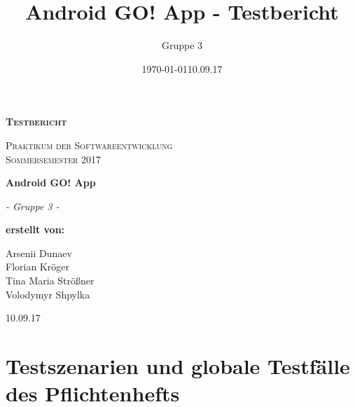 \documentclass[11pt,a4paper]{scrartcl}
\date{\today}
\title{Android GO! App - Testbericht}
\author{Gruppe 3}
\date{10.09.17}
\begin{document}
\begin{titlepage}
	\begin{center}
	{\scshape\LARGE \bfseries Testbericht \par}
	\vspace{1cm}
	{\scshape\Large Praktikum der Softwareentwicklung \\ Sommersemester 2017\par}
	\vspace{1.5cm}
	{\huge\bfseries Android GO! App\par}
	\vspace{2cm}
	{\Large\itshape - Gruppe 3 -\par}
	\vfill
	{\bfseries erstellt von:\par}
	Arsenii Dunaev \\
	Florian Kröger \\
	Tina Maria Strößner \\
	Volodymyr Shpylka \\	
	\vfill
	{\large 10.09.17 \par}	
	\end{center}
\end{titlepage}

\newpage

\tableofcontents

\newpage
\section{Testszenarien und globale Testfälle des Pflichtenhefts}
\end{document}
